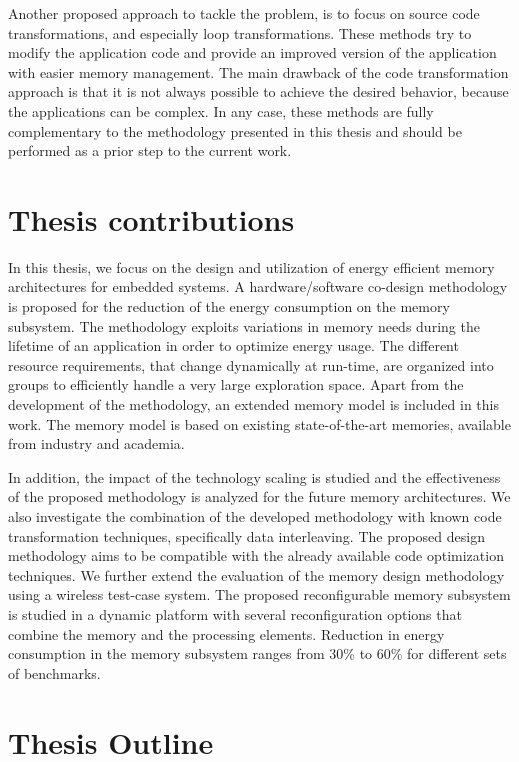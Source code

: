 Another proposed approach to tackle the problem, is to focus on source code transformations, and especially loop transformations.
These methods try to modify the application code and provide an improved version of the application with easier memory management.
The main drawback of the code transformation approach is that it is not always possible to achieve the desired behavior, because the applications can be complex.
In any case, these methods are fully complementary to the methodology presented in this thesis and should be performed as a prior step to the current work. 

\section{Thesis contributions}

In this thesis, we focus on the design and utilization of energy efficient memory architectures for embedded systems.
A hardware/software co-design methodology is proposed for the reduction of the energy consumption on the memory subsystem. 
The  methodology exploits variations in memory needs during the lifetime of an application in order to optimize energy usage. 
The different resource requirements, that change dynamically at run-time, are organized into groups to efficiently handle a very large exploration space.
Apart from the development of the methodology, an extended memory model is included in this work. 
The memory model is based on existing state-of-the-art memories, available from industry and academia.

In addition, the impact of the technology scaling is studied and the effectiveness of the proposed methodology is analyzed for the future memory architectures.
We also investigate the combination of the developed methodology with known code transformation techniques, specifically data interleaving.
The proposed design methodology aims to be compatible with the already available code optimization techniques.
We further extend the evaluation of the memory design methodology using a wireless test-case system.
The proposed reconfigurable memory subsystem is studied in a dynamic platform with several reconfiguration options that combine the memory and the processing elements.
Reduction in energy consumption in the memory subsystem ranges from 30\% to 60\% for different sets of benchmarks.

\section{Thesis Outline}

